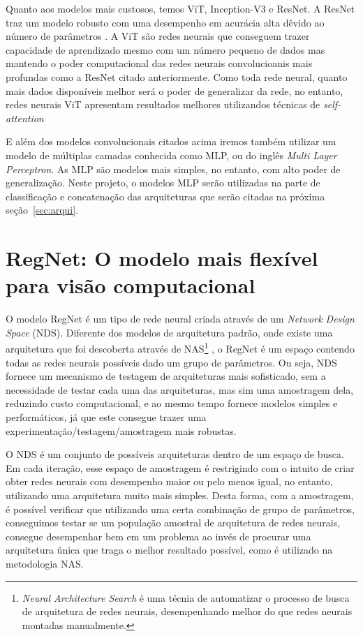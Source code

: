\documentclass[ %
	msc, %
	portugues %
]{../ppgccufmg}
\begin{document}
    Quanto aos modelos mais custosos, temos ViT, Inception-V3 e  ResNet. A ResNet traz um modelo
    robusto com uma desempenho em acurácia alta dêvido ao número de parâmetros
    \citep{DBLP:journals/corr/HeZRS15}. A ViT são redes neurais que
    conseguem trazer capacidade de aprendizado mesmo com um número pequeno de dados mas mantendo o
    poder computacional das redes neurais convolucioanis mais profundas como a ResNet citado
    anteriormente. Como toda rede neural, quanto mais dados disponíveis melhor será o poder de
    generalizar da rede, no entanto, redes neurais ViT apresentam resultados melhores utilizandos
    técnicas de \textit{self-attention} \citep{selfvit, DBLP:journals/corr/abs-2010-11929}


    E além dos modelos convolucionais citados acima iremos também utilizar um modelo de múltiplas
    camadas conhecida como MLP, ou do inglês \textit{Multi Layer Perceptron}. As MLP são modelos
    mais simples, no entanto, com alto poder de generalização. Neste projeto, o modelos MLP serão
    utilizadas na parte de classificação e concatenação das arquiteturas que serão citadas na
    próxima seção~\ref{sec:arqui}.

    \section{RegNet: O modelo mais flexível para visão computacional}

    O modelo RegNet é um tipo de rede neural criada através de um \textit{Network Design Space} (NDS).
    Diferente dos modelos de arquitetura padrão, onde existe uma arquitetura que foi descoberta através de
    NAS\footnote{\textit{Neural Architecture Search} é uma técnia de automatizar o processo de busca
    de arquitetura de redes neurais, desempenhando melhor do que redes neurais montadas manualmente.}
    \citep{DBLP:journals/corr/ZophL16}, o RegNet é um espaço contendo todas as redes neurais possíveis dado um grupo de
    parâmetros. Ou seja, NDS fornece um mecanismo de testagem de arquiteturas mais sofisticado, sem a necessidade
    de testar cada uma das arquiteturas, mas sim uma amostragem dela, reduzindo custo computacional, e ao mesmo tempo fornece modelos
    simples e performáticos, já que este consegue trazer uma experimentação/testagem/amostragem mais robustas.

    O NDS é um conjunto de possíveis arquiteturas dentro de um espaço de busca. Em cada iteração,
    esse espaço de amostragem é restrigindo com o intuito de criar obter redes neurais com
    desempenho maior ou pelo menos igual, no entanto, utilizando uma arquitetura muito mais
    simples. Desta forma, com a amostragem, é possível verificar que utilizando uma certa combinação
    de grupo de parâmetros, conseguimos testar se um população amostral de arquitetura de redes
    neurais, consegue desempenhar bem em um problema ao invés de procurar uma arquitetura única que
    traga o melhor resultado possível, como é utilizado na metodologia
    NAS\citep{DBLP:journals/corr/ZophL16}.
\end{document}
